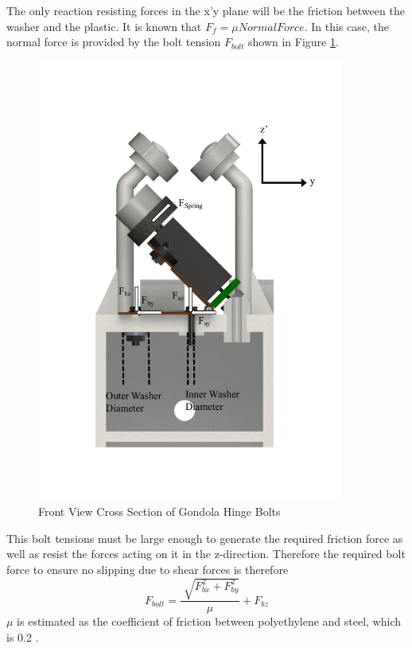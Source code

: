 \documentclass[../main.tex]{subfiles}
\begin{document}
The only reaction resisting forces in the x'y plane will be the friction between the washer and the plastic. It is known that $F_f = \mu Normal Force$. In this case, the normal force is provided by the bolt tension $F_{bolt}$ shown in Figure \ref{fig:boltCrossSection}. 
\begin{figure}[H]
	\centering
	\includegraphics[width=0.9\textwidth]{img/gondola/boltCrossSection.pdf}
	\caption{Front View Cross Section of Gondola Hinge Bolts}
	\label{fig:boltCrossSection}
\end{figure}
This bolt tensions must be large enough to generate the required friction force as well as resist the forces acting on it in the z-direction. Therefore the required bolt force to ensure no slipping due to shear forces is therefore
\begin{equation}
F_{bolt} = \dfrac{\sqrt[]{F_{bx}^2 + F_{by}^2}}{\mu} + F_{bz}
\end{equation}
$\mu $ is estimated as the coefficient of friction between polyethylene and steel, which is 0.2 \cite{Friction}. \\
\end{document}
